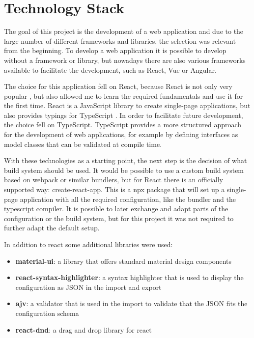 \chapter{Technology Stack}
\label{sec:tech_stack}
The goal of this project is the development of a web application and due to the large number of different frameworks and libraries, the selection was relevant from the beginning. To develop a web application it is possible to develop without a framework or library, but nowadays there are also various frameworks available to facilitate the development, such as React, Vue or Angular.

The choice for this application fell on React, because React is not only very popular \cite{2020DeveloperSurvey}, but also allowed me to learn the required fundamentals and use it for the first time. React is a JavaScript library to create single-page applications, but also provides typings for TypeScript \cite{createReactApp}. In order to facilitate future development, the choice fell on TypeScript. TypeScript provides a more structured approach for the development of web applications, for example by defining interfaces as model classes that can be validated at compile time.

With these technologies as a starting point, the next step is the decision of what build system should be used. It would be possible to use a custom build system based on webpack or similar bundlers, but for React there is an officially supported way: create-react-app. This is a npx package that will set up a single-page application with all the required configuration, like the bundler and the typescript compiler. It is possible to later exchange and adapt parts of the configuration or the build system, but for this project it was not required to further adapt the default setup.

In addition to react some additional libraries were used:

\begin{itemize}
    \item \textbf{material-ui}: a library that offers standard material design components
    \item \textbf{react-syntax-highlighter}: a syntax highlighter that is used to display the configuration as JSON in the import and export 
    \item \textbf{ajv}: a validator that is used in the import to validate that the JSON fits the configuration schema
    \item \textbf{react-dnd}: a drag and drop library for react
\end{itemize}

\newpage